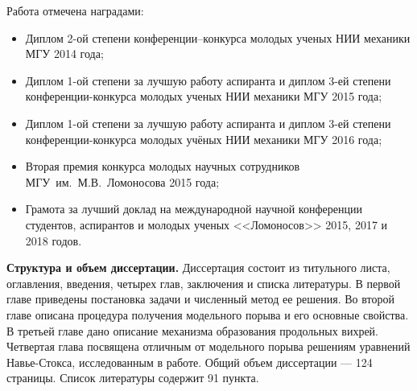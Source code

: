 Работа отмечена наградами:
\begin{itemize}
\item Диплом 2-ой степени конференции--конкурса молодых ученых НИИ механики МГУ 2014 года;
\item Диплом 1-ой степени за лучшую работу аспиранта и диплом 3-ей степени конференции-конкурса молодых ученых НИИ механики МГУ 2015 года;
\item Диплом 1-ой степени за лучшую работу аспиранта и диплом 3-ей степени конференции-конкурса молодых учёных НИИ механики МГУ 2016 года;
\item Вторая премия конкурса молодых научных сотрудников МГУ~им.~М.В.~Ломоносова 2015 года;
\item Грамота за лучший доклад на международной научной конференции студентов, аспирантов и молодых ученых <<Ломоносов>> 2015, 2017 и 2018 годов.
\end{itemize}

{\bf Структура и объем диссертации.} 
Диссертация состоит из титульного листа, оглавления, введения, четырех глав, заключения и списка литературы. В первой главе приведены постановка задачи и численный метод ее решения. Во второй главе описана процедура получения модельного порыва и его основные свойства. В третьей главе дано описание механизма образования продольных вихрей. Четвертая глава посвящена отличным от модельного порыва решениям уравнений Навье-Стокса, исследованным в работе. Общий объем диссертации --- 124 страницы. Список литературы содержит 91 пункта. 







